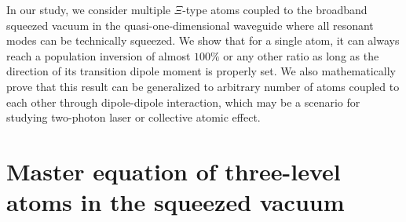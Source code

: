 \documentclass[aps,showpacs,twocolumn,twoside,groupedaddress]{revtex4}
\begin{document}
In our study, we consider multiple $\Xi$-type atoms coupled to the broadband squeezed vacuum in the quasi-one-dimensional waveguide where all resonant modes can be technically squeezed. We show that for a single atom, it can always reach a population inversion of almost $100\%$ or any other ratio as long as the direction of its transition dipole moment is properly set. We also mathematically prove that this result can be generalized to arbitrary number of atoms coupled to each other through dipole-dipole interaction, which may be a scenario for studying two-photon laser or collective atomic effect.

\section{Master equation of three-level atoms in the squeezed vacuum}
\end{document}
